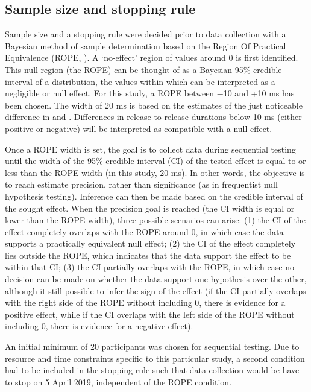 \documentclass[
  12pt,
  a4paper,
]{article}
\begin{document}
\hypertarget{sample-size-and-stopping-rule}{%
\subsection{Sample size and stopping
rule}\label{sample-size-and-stopping-rule}}

\label{s:sample-size}

Sample size and a stopping rule were decided prior to data collection
with a Bayesian method of sample determination based on the Region Of
Practical Equivalence (ROPE, \citealt{kruschke2015, vasishth2018a}). A
`no-effect' region of values around 0 is first identified. This null
region (the ROPE) can be thought of as a Bayesian 95\% credible interval
of a distribution, the values within which can be interpreted as a
negligible or null effect. For this study, a ROPE between −10 and +10 ms
has been chosen. The width of 20 ms is based on the estimates of the
just noticeable difference in \citet{huggins1972} and
\citet{nooteboom1980}. Differences in release-to-release durations below
10 ms (either positive or negative) will be interpreted as compatible
with a null effect.

Once a ROPE width is set, the goal is to collect data during sequential
testing until the width of the 95\% credible interval (CI) of the tested
effect is equal to or less than the ROPE width (in this study, 20 ms).
In other words, the objective is to reach estimate precision, rather
than significance (as in frequentist null hypothesis testing). Inference
can then be made based on the credible interval of the sought effect.
When the precision goal is reached (the CI width is equal or lower than
the ROPE width), three possible scenarios can arise: (1) the CI of the
effect completely overlaps with the ROPE around 0, in which case the
data supports a practically equivalent null effect; (2) the CI of the
effect completely lies outside the ROPE, which indicates that the data
support the effect to be within that CI; (3) the CI partially overlaps
with the ROPE, in which case no decision can be made on whether the data
support one hypothesis over the other, although it still possible to
infer the sign of the effect (if the CI partially overlaps with the
right side of the ROPE without including 0, there is evidence for a
positive effect, while if the CI overlaps with the left side of the ROPE
without including 0, there is evidence for a negative effect).

An initial minimum of 20 participants was chosen for sequential testing.
Due to resource and time constraints specific to this particular study,
a second condition had to be included in the stopping rule such that
data collection would be have to stop on 5 April 2019, independent of
the ROPE condition.
\end{document}
